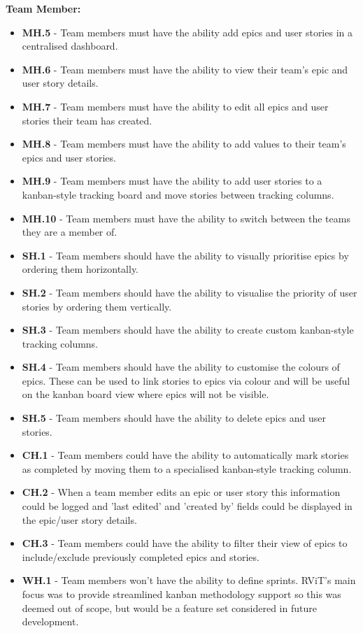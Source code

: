\documentclass[l4proj.tex]{subfiles}
\begin{document}
\textbf{Team Member:}
\begin{itemize}
     \item \textbf{MH.5} - Team members must have the ability add epics and user stories in a centralised dashboard. 
     \item \textbf{MH.6} - Team members must have the ability to view their team's epic and user story details. 
     \item \textbf{MH.7} - Team members must have the ability to edit all epics and user stories their team has created. 
     \item \textbf{MH.8} - Team members must have the ability to add values to their team's epics and user stories. 
     \item \textbf{MH.9} - Team members must have the ability to add user stories to a kanban-style tracking board and move stories between tracking columns.
     \item \textbf{MH.10} - Team members must have the ability to switch between the teams they are a member of. \\

    \item \textbf{SH.1} - Team members should have the ability to visually prioritise epics by ordering them horizontally. 
    \item \textbf{SH.2} - Team members should have the ability to visualise the priority of user stories by ordering them vertically. 
    \item \textbf{SH.3} - Team members should have the ability to create custom kanban-style tracking columns.
    \item \textbf{SH.4} - Team members should have the ability to customise the colours of epics. These can be used to link stories to epics via colour and will be useful on the kanban board view where epics will not be visible.
    \item \textbf{SH.5} - Team members should have the ability to delete epics and user stories.\\

    \item \textbf{CH.1} - Team members could have the ability to automatically mark stories as completed by moving them to a specialised kanban-style tracking column.
    \item \textbf{CH.2} - When a team member edits an epic or user story this information could be logged and 'last edited' and 'created by' fields could be displayed in the epic/user story details.
    \item \textbf{CH.3} - Team members could have the ability to filter their view of epics to include/exclude previously completed epics and stories. \\

    \item \textbf{WH.1} - Team members won't have the ability to define sprints. RViT's main focus was to provide streamlined kanban methodology support so this was deemed out of scope, but would be a feature set considered in future development.\\
\end{itemize}
\hfill
\end{document}
